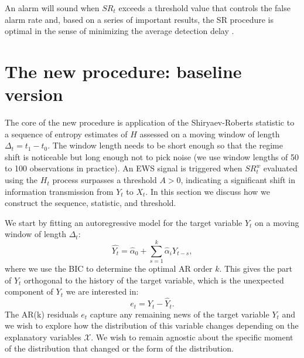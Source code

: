 An alarm will sound when $SR_t$ exceeds a threshold value that controls the false alarm rate and, based on a series of important results, the SR procedure is optimal in the sense of minimizing the average detection delay \cite[see, e.g.,][]{poluchenko/tartakovsky:10}. 



\section{The new procedure: baseline version}\label{sec:proc}
\noindent The core of the new procedure is application of the Shiryaev-Roberts statistic to a sequence of entropy estimates of $H$ assessed on a moving window of length $\Delta_t =t_1-t_0$. The window length needs to be short enough so that the regime shift is noticeable but long enough not to pick noise (we use window lengths of 50 to 100 observations in practice).
An EWS signal is  triggered when $SR_t^w$ evaluated using the $H_t$ process surpasses a threshold $A>0$, indicating a significant shift in information transmission from $Y_t$ to $X_t$. In this section we discuss how we construct the sequence, statistic, and threshold. 


 





    
    
    





    
    


We start by fitting an autoregressive model for the target variable $Y_t$ on a moving window of length $\Delta_t$: 
    \begin{equation}
        \hat{Y_t} = \hat{\alpha}_0 + \sum\limits_{s=1}^{k} \hat{\alpha}_i Y_{t-s},
    \end{equation} 
where we use the BIC to determine the optimal AR order $k$. This gives the part of $Y_t$ orthogonal to the history of the target variable, which is the unexpected component of $Y_t$ we are interested in: 
    \begin{equation}\label{eq:resid}
        e_t = Y_t - \hat{Y}_t.
    \end{equation}
The AR(k) residuals $e_t$ capture any remaining news of the target variable $Y_t$ and we wish to explore how the distribution of this variable changes depending on the explanatory variables $\mathcal{X}$. We wish to remain agnostic about the specific moment of the distribution that changed or the form of the distribution. 

